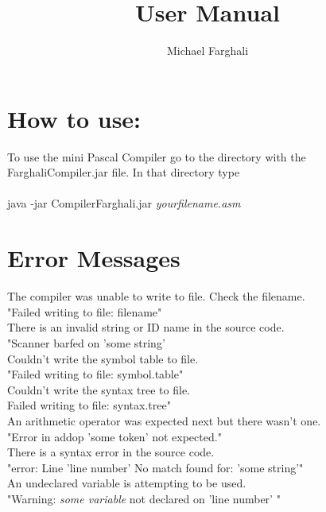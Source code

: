 \documentclass[10]{article}
\title{User Manual}
\author{Michael Farghali}
\begin{document}
	
	\maketitle	
	
\section*{How to use: }

To use the mini Pascal Compiler go to the directory with the FarghaliCompiler.jar file. In that directory
type\\ \\
 java -jar CompilerFarghali.jar \textit{yourfilename.asm}



\section*{Error Messages}

The compiler was unable to write to file. Check the filename.\\
"Failed writing to file: filename"\\

There is an invalid string or ID name in the source code. \\
"Scanner barfed on 'some string' \\

Couldn't write the symbol table to file. \\
"Failed writing to file: symbol.table"\\

Couldn't write the syntax tree to file. \\
Failed writing to file: syntax.tree" \\

An arithmetic operator was expected next but there wasn't one.\\
"Error in addop 'some token' not expected."\\

There is a syntax error in the source code.\\
"error: Line 'line number'  No match found for: 'some string'"\\

An undeclared variable is attempting to be used. \\
"Warning: \textit{some variable} not declared on 'line number' "
\end{document}
